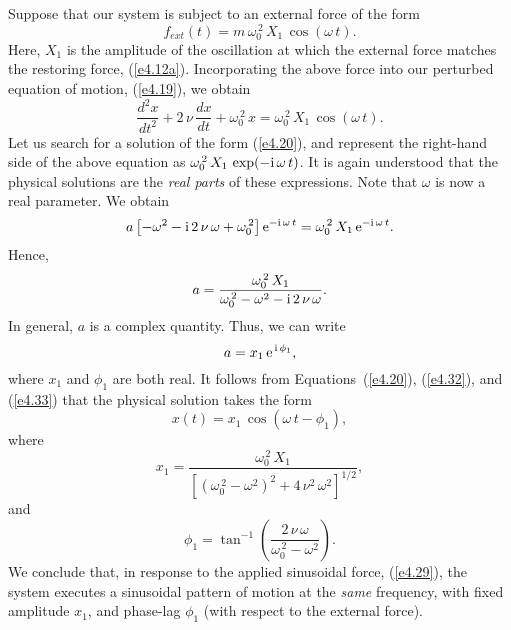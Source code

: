 Suppose that our system is subject to an external force of the form
\begin{equation}\label{e4.29}
f_{ext}(t) = m\,\omega_0^{\,2}\,X_1\,\cos(\omega\,t).
\end{equation}
Here, $X_1$ is the  amplitude of the oscillation at which the external force matches the restoring
force, (\ref{e4.12a}). Incorporating the above force into our perturbed
equation of motion, (\ref{e4.19}), we obtain
\begin{equation}
\frac{d^2 x}{dt^2} + 2\,\nu\,\frac{dx}{dt} + \omega_0^{\,2}\,x
= \omega_0^{\,2}\,X_1\,\cos(\omega\,t).
\end{equation}
Let us  search for a solution of the form (\ref{e4.20}), and
represent the right-hand side of the above equation as
$\omega_0^{\,2}\,X_1\,\exp(-{\rm i}\,\omega\,t)$. It is again understood
that the physical solutions are the {\em real parts}\/ of these expressions. 
Note that $\omega$ is now a real parameter. We obtain
\begin{equation}
a\left[-\omega^2-{\rm i}\,2\,\nu\,\omega + \omega_0^{\,2}\right] {\rm e}^{-{\rm i}\,\omega\,t}
= \omega_0^{\,2}\,X_1\,{\rm e}^{-{\rm i}\,\omega\,t}.
\end{equation}
Hence,
\begin{equation}\label{e4.32}
a = \frac{\omega_0^{\,2}\,X_1}{\omega_0^{\,2}-\omega^2 - {\rm i}\,2\,\nu\,\omega}.
\end{equation}
In general, $a$ is a complex quantity. Thus, we can write
\begin{equation}\label{e4.33}
a = x_1\,{\rm e}^{\,{\rm i}\,\phi_1},
\end{equation}
where $x_1$ and $\phi_1$ are both real. It follows from 
Equations~(\ref{e4.20}),  (\ref{e4.32}), and (\ref{e4.33}) that the physical solution takes the
form
\begin{equation}
x(t) = x_1\,\cos(\omega\,t-\phi_1),
\end{equation}
where 
\begin{equation}\label{e4.35}
x_1 = \frac{\omega_0^{\,2}\,X_1}{\left[(\omega_0^{\,2}-\omega^2)^2
+ 4\,\nu^2\,\omega^2\right]^{1/2}},
\end{equation}
and
\begin{equation}\label{e4.36}
\phi_1 = \tan^{-1}\left(\frac{2\,\nu\,\omega}{\omega_0^{\,2}-\omega^2}\right).
\end{equation}
We conclude that, in response to the applied sinusoidal force, (\ref{e4.29}), the system
executes a sinusoidal pattern of motion at the {\em same}\/ frequency, with fixed amplitude $x_1$, and phase-lag $\phi_1$ (with respect to
the external force).

